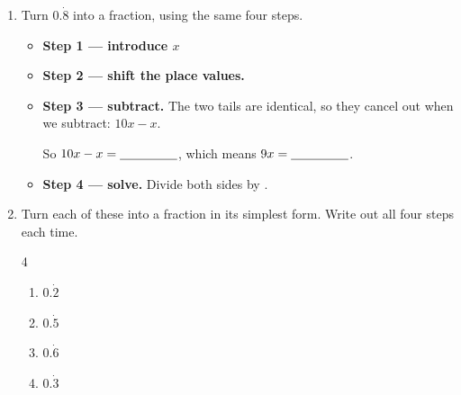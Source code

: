 \documentclass[12pt,a4paper]{article}
\newcommand{\ansline}[1][2.2cm]{\underline{\hspace{#1}}}
\newcommand{\tailbox}[4]{%
  ({0.34+#1*0.34-0.17},#3) rectangle ({0.34+#2*0.34+0.17},#4)}
\newcommand{\drowgap}[4]{%
  \node[anchor=east,font=\small] at (-1.25,#1) {#2};
  \node[anchor=east,font=\small] at (-0.12,#1) {#3};
  \node[font=\small] at (0,#1) {.};
  \foreach \i in {1,...,#4}
    {\draw[gray!60] ({0.34+(\i-1)*0.34-0.13},{#1-0.16}) --
                    ({0.34+(\i-1)*0.34+0.13},{#1-0.16});}
  \node[font=\small] at ({0.34+#4*0.34},#1) {$\ldots$};%
}
\begin{document}
\begin{enumerate}[resume]
\item Turn $0.\dot{8}$ into a fraction, using the same four steps.
\begin{itemize}[label={},leftmargin=1.8em,itemsep=12pt,topsep=6pt]
  \item \textbf{Step 1 --- introduce $x$} \hfill \ansline[7cm]
  \item \textbf{Step 2 --- shift the place values.} \hfill \ansline[7cm]
  \item \textbf{Step 3 --- subtract.} The two tails are identical, so they
        cancel out when we subtract: $10x-x$.
        \begin{center}
        \end{center}
        \vspace{-2pt}
        So $10x-x=\ansline[1.6cm]$, which means $9x=\ansline[1.6cm]$.
  \item \textbf{Step 4 --- solve.} Divide both sides by \ansline[0.9cm].

        \vspace{11em}
\end{itemize}

\item Turn each of these into a fraction in its simplest form. Write out all
four steps each time.
\begin{multicols}{4}
\begin{enumerate}
  \item $0.\dot{2}$
  \item $0.\dot{5}$
  \item $0.\dot{6}$
  \item $0.\dot{3}$
\end{enumerate}
\end{multicols}
\vspace{28em}

\end{enumerate}

\newpage
\end{document}
